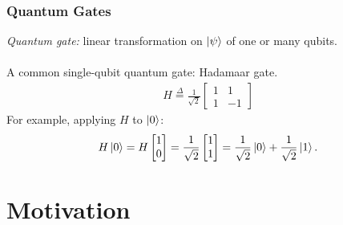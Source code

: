 \documentclass{beamer}
\theoremstyle{definition}
\begin{document}
\begin{frame}
\frametitle{Quantum Gates}

\textit{Quantum gate:} linear transformation on $\left\vert{\psi}\right\rangle$ of one or many qubits. \\
$\,$\\
A common single-qubit quantum gate: Hadamaar gate.
\begin{align*}
 H \stackrel{\Delta}{=}\frac{1}{\sqrt{2}}\begin{bmatrix}
1&1\\1&-1
\end{bmatrix}
\end{align*}
For example, applying $H$ to $\left\vert{0}\right\rangle$:
\begin{align*}
H\left\vert{0}\right\rangle = H\begin{bmatrix}
1\\0
\end{bmatrix} = \frac{1}{\sqrt{2}}\begin{bmatrix}
1\\1
\end{bmatrix} = \frac{1}{\sqrt{2}}\left\vert{0}\right\rangle + \frac{1}{\sqrt{2}}\left\vert{1}\right\rangle.
\end{align*}


\end{frame}























\section{Motivation}
\end{document}
